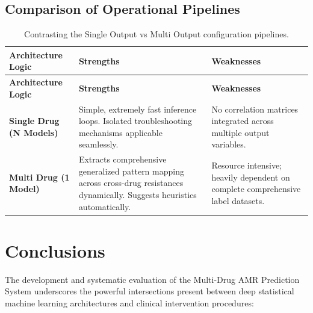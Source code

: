 \documentclass[12pt,a4paper]{report}
\begin{document}
\section{Comparison of Operational Pipelines}

\begin{longtable}{@{}p{4.2cm}p{4.2cm}p{4.2cm}@{}}
\toprule
\textbf{Architecture Logic} &
\textbf{Strengths} &
\textbf{Weaknesses} \\
\midrule
\endfirsthead
\toprule
\textbf{Architecture Logic} &
\textbf{Strengths} &
\textbf{Weaknesses} \\
\midrule
\endhead
\bottomrule
\caption{Contrasting the Single Output vs Multi Output configuration pipelines.}
\label{tab:compare}
\endlastfoot
\bottomrule
\endfoot
\textbf{Single Drug (N Models)} & Simple, extremely fast inference loops. Isolated troubleshooting mechanisms applicable seamlessly. & No correlation matrices integrated across multiple output variables.\\
\textbf{Multi Drug (1 Model)} & Extracts comprehensive generalized pattern mapping across cross-drug resistances dynamically. Suggests heuristics automatically. & Resource intensive; heavily dependent on complete comprehensive label datasets.\\
\end{longtable}

\chapter{Conclusions}
\thispagestyle{fancy}

The development and systematic evaluation of the Multi-Drug AMR Prediction System underscores the powerful intersections present between deep statistical machine learning architectures and clinical intervention procedures:
\end{document}
